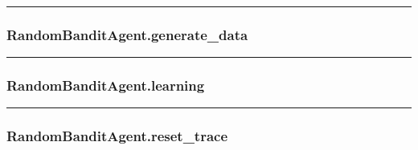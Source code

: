 \begin{center}\rule{0.5\linewidth}{\linethickness}\end{center}

\hypertarget{randombanditagent.generate_data}{%
\subsubsection{RandomBanditAgent.generate\_data}\label{randombanditagent.generate_data}}

\begin{Shaded}
\begin{Highlighting}[]
\end{Highlighting}
\end{Shaded}

\begin{center}\rule{0.5\linewidth}{\linethickness}\end{center}

\hypertarget{randombanditagent.learning}{%
\subsubsection{RandomBanditAgent.learning}\label{randombanditagent.learning}}

\begin{Shaded}
\begin{Highlighting}[]
\end{Highlighting}
\end{Shaded}

\begin{center}\rule{0.5\linewidth}{\linethickness}\end{center}

\hypertarget{randombanditagent.reset_trace}{%
\subsubsection{RandomBanditAgent.reset\_trace}\label{randombanditagent.reset_trace}}

\begin{Shaded}
\begin{Highlighting}[]
\OperatorTok{=}\NormalTok{)}
\end{Highlighting}
\end{Shaded}

